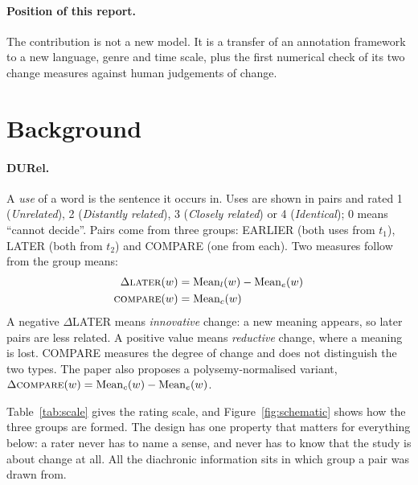 \documentclass{article}
\newif\iffirstsectiondone
\let\originalsection\section
\renewcommand{\section}{%
  \iffirstsectiondone\Needspace*{0.12\textheight}\else\firstsectiondonetrue\fi
  \originalsection}
\begin{document}
\begin{table}[t]\centering\footnotesize
\caption{Resources for meaning change and meaning in context. The unit judged is
what a single annotation decision covers.}
\label{tab:resources}

\end{table}

\paragraph{Position of this report.} The contribution is not a new model. It is a
transfer of an annotation framework to a new language, genre and time scale, plus
the first numerical check of its two change measures against human judgements of
change.

\section{Background}

\paragraph{DURel.} A \emph{use} of a word is the sentence it occurs in. Uses are
shown in pairs and rated 1 (\textit{Unrelated}), 2 (\textit{Distantly related}),
3 (\textit{Closely related}) or 4 (\textit{Identical}); 0 means ``cannot
decide''. Pairs come from three groups: EARLIER (both uses from $t_1$), LATER
(both from $t_2$) and COMPARE (one from each). Two measures follow from the
group means:
\begin{align}
\Delta\textsc{later}(w) &= \mathrm{Mean}_l(w) - \mathrm{Mean}_e(w) \\
\textsc{compare}(w) &= \mathrm{Mean}_c(w)
\end{align}
A negative $\Delta$LATER means \emph{innovative} change: a new meaning appears,
so later pairs are less related. A positive value means \emph{reductive} change,
where a meaning is lost. COMPARE measures the degree of change and does not
distinguish the two types. The paper also proposes a polysemy-normalised
variant, $\Delta\textsc{compare}(w)=\mathrm{Mean}_c(w)-\mathrm{Mean}_e(w)$.

Table~\ref{tab:scale} gives the rating scale, and Figure~\ref{fig:schematic}
shows how the three groups are formed. The design has one property that matters
for everything below: a rater never has to name a sense, and never has to know
that the study is about change at all. All the diachronic information sits in
which group a pair was drawn from.
\end{document}

